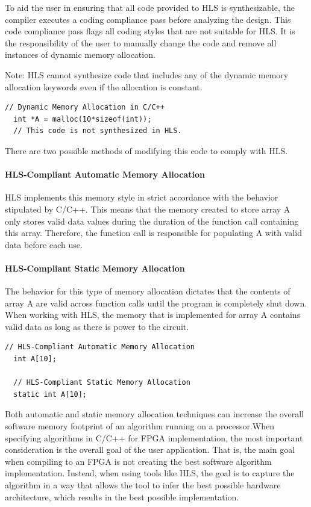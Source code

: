 \par To aid the user in ensuring that all code provided to HLS is synthesizable, the compiler
executes a coding compliance pass before analyzing the design. This code compliance pass
flags all coding styles that are not suitable for HLS. It is the responsibility of the user to
manually change the code and remove all instances of dynamic memory allocation. 

\begin{highlight}
  Note: HLS cannot synthesize code that includes any of the dynamic memory allocation keywords even if the allocation is constant.
\end{highlight}


\begin{lstlisting}[style=CStyle]
  // Dynamic Memory Allocation in C/C++
  int *A = malloc(10*sizeof(int));
  // This code is not synthesized in HLS.
\end{lstlisting}

There are two possible methods of modifying this code to comply with HLS. 

\paragraph{HLS-Compliant Automatic Memory Allocation}
HLS implements this memory style in strict accordance with the behavior stipulated by C/C++. This means that the memory created to store array A only stores valid data values during the duration of the function call containing this array. Therefore, the function call is
responsible for populating A with valid data before each use.

\paragraph{HLS-Compliant Static Memory Allocation}
The behavior for this type of memory allocation dictates that the contents of array A are valid across
function calls until the program is completely shut down. When working with HLS, the
memory that is implemented for array A contains valid data as long as there is power to the
circuit.

\begin{lstlisting}[style=CStyle]
  // HLS-Compliant Automatic Memory Allocation
  int A[10];

  // HLS-Compliant Static Memory Allocation
  static int A[10];
\end{lstlisting}

Both automatic and static memory allocation techniques can increase the overall software
memory footprint of an algorithm running on a processor.When specifying algorithms in
C/C++ for FPGA implementation, the most important consideration is the overall goal of
the user application. That is, the main goal when compiling to an FPGA is not creating the
best software algorithm implementation. Instead, when using tools like HLS, the goal is to
capture the algorithm in a way that allows the tool to infer the best possible hardware
architecture, which results in the best possible implementation.


